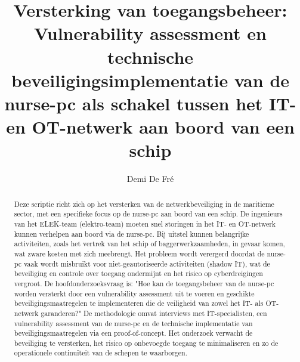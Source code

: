 \documentclass{hogent-article}
\title{Versterking van toegangsbeheer: Vulnerability assessment en 
technische beveiligingsimplementatie van de nurse-pc als schakel tussen het IT- en OT-netwerk aan boord van een schip}
\author{Demi De Fré}
\begin{document}
\begin{abstract}
  Deze scriptie richt zich op het versterken van de netwerkbeveiliging in de maritieme sector, met een specifieke focus op de nurse-pc aan boord van een schip. 
  De ingenieurs van het ELEK-team (elektro-team) moeten snel storingen in het IT- en OT-netwerk kunnen verhelpen aan boord via de nurse-pc. 
  Bij uitstel kunnen belangrijke activiteiten, zoals het vertrek van het schip of baggerwerkzaamheden, in gevaar komen, wat zware kosten met zich meebrengt. 
  Het probleem wordt verergerd doordat de nurse-pc vaak wordt misbruikt voor niet-geautoriseerde activiteiten (shadow IT), wat de beveiliging en controle over toegang 
  ondermijnt en het risico op cyberdreigingen vergroot. De hoofdonderzoeksvraag is: "Hoe kan de toegangsbeheer van de nurse-pc worden versterkt door een vulnerability 
  assessment uit te voeren en geschikte beveiligingsmaatregelen te implementeren die de veiligheid van zowel het IT- als OT-netwerk garanderen?" 
  De methodologie omvat interviews met IT-specialisten, een vulnerability assessment van de nurse-pc en de technische implementatie van beveiligingsmaatregelen via een proof-of-concept. 
  Het onderzoek verwacht de beveiliging te versterken, het risico op onbevoegde toegang te minimaliseren en zo de operationele continuïteit van de schepen te waarborgen. 
\end{abstract}

\tableofcontents



\printbibliography[heading=bibintoc]
\end{document}
